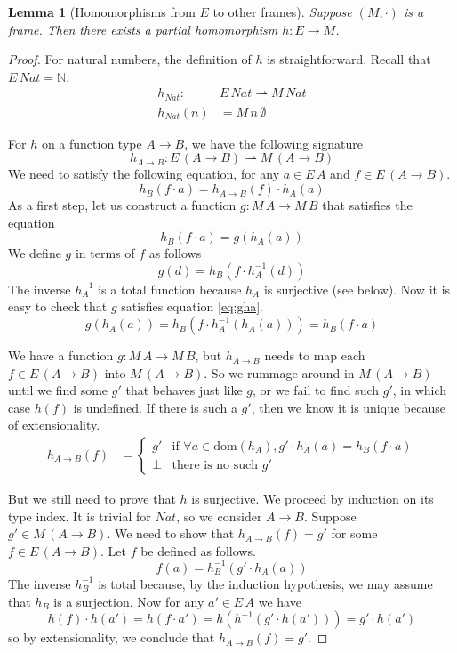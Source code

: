 \documentclass{tufte-handout}
\newcommand{\pto}[0]{\rightharpoonup}
\newcommand{\NATTY}[0]{\mathit{Nat}}
\newtheorem{lemma}[theorem]{Lemma}
\begin{document}
\begin{lemma}[Homomorphisms from $E$ to other frames]
\label{lem:homo-model-frame}
  Suppose $(M,\cdot)$ is a frame. Then there exists a partial
  homomorphism $h : E \to M$.
\end{lemma}
\begin{proof}
  For natural numbers, the definition of $h$ is straightforward.
  Recall that $E\,\NATTY = \mathbb{N}$.
  \begin{align*}
    h_{\NATTY} : \; & E\,\NATTY \pto M\,\NATTY \\
    h_{\NATTY}(n) &= M\,n\,\emptyset 
  \end{align*}

  For $h$ on a function type $A\to B$, we have the following signature
  \[
  h_{A \to B} : E\,(A \to B) \pto M\,(A \to B)
  \]
  We need to satisfy the following equation, for any $a \in E\,A$
  and $f \in E\,(A \to B)$.
  \[
    h_B(f \cdot a) = h_{A \to B}(f) \cdot h_A(a)
  \]
  As a first step, let us construct a function $g : M\,A \to M\,B$
  that satisfies the equation
  \begin{equation}\label{eq:gha}
    h_B(f \cdot a) = g(h_A(a))
  \end{equation}
  We define $g$ in terms of $f$ as follows
  \[
    g(d) = h_B(f \cdot h^{-1}_A(d))
  \]
  The inverse $h^{-1}_A$ is a total function because $h_A$ is
  surjective (see below).  Now it is easy to check that $g$ satisfies
  equation \eqref{eq:gha}.
  \[
  g(h_A(a)) = h_B(f \cdot h^{-1}_A(h_A(a))) = h_B(f \cdot a)
  \]

  We have a function $g : M\,A \to M\,B$, but $h_{A\to B}$ needs to
  map each $f \in E\,(A \to B)$ into $M\,(A \to B)$. So we rummage
  around in $M\,(A \to B)$ until we find some $g'$ that behaves just
  like $g$, or we fail to find such $g'$, in which case $h(f)$ is
  undefined.
  If there is such a $g'$, then we know it is unique
  because of extensionality.
  \begin{align*}
    h_{A \to B}(f) &= 
    \begin{cases}
      g' & \text{if } \forall a \in \mathrm{dom}(h_A), g' \cdot h_A(a) = h_B(f \cdot a)\\
      \bot & \text{there is no such $g'$}
    \end{cases}
  \end{align*}

  But we still need to prove that $h$ is surjective. We proceed by
  induction on its type index.  It is trivial for $\NATTY$, so we
  consider $A \to B$.  Suppose $g' \in M\,(A \to B)$. We need to show
  that $h_{A\to B}(f) = g'$ for some $f \in E\,(A\to B)$.  Let $f$ be
  defined as follows.
  \[
  f(a) = h^{-1}_B(g' \cdot h_A(a))
  \]
  The inverse $h^{-1}_B$ is total because, by the induction hypothesis,
  we may assume that $h_B$ is a surjection.
  Now for any $a' \in E\,A$ we have
  \[
  h(f) \cdot h(a') = h(f \cdot a')
   = h(h^{-1}(g' \cdot h(a')))
   = g' \cdot h(a')
  \]
  so by extensionality, we conclude that $h_{A\to B}(f) = g'$.

\end{proof}
\end{document}
